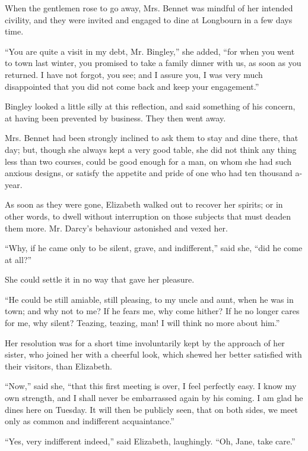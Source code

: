 When the gentlemen rose to go away, Mrs. Bennet was
mindful of her intended civility, and they were invited
and engaged to dine at Longbourn in a few days time.

“You are quite a visit in my debt, Mr. Bingley,” she
added, “for when you went to town last winter, you
promised to take a family dinner with us, as soon as you
returned. I have not forgot, you see; and I assure you,
I was very much disappointed that you did not come back
and keep your engagement.”

Bingley looked a little silly at this reflection, and said
something of his concern, at having been prevented by
business. They then went away.

Mrs. Bennet had been strongly inclined to ask them to
stay and dine there, that day; but, though she always
kept a very good table, she did not think any thing less
than two courses, could be good enough for a man, on
whom she had such anxious designs, or satisfy the appetite
and pride of one who had ten thousand a-year.


As soon as they were gone, Elizabeth walked out to
recover her spirits; or in other words, to dwell without
interruption on those subjects that must deaden them
more. Mr. Darcy’s behaviour astonished and vexed her.

“Why, if he came only to be silent, grave, and indifferent,”
said she, “did he come at all?”

She could settle it in no way that gave her pleasure.

“He could be still amiable, still pleasing, to my uncle
and aunt, when he was in town; and why not to me?
If he fears me, why come hither? If he no longer cares
for me, why silent? Teazing, teazing, man! I will think
no more about him.”

Her resolution was for a short time involuntarily kept
by the approach of her sister, who joined her with a cheerful
look, which shewed her better satisfied with their
visitors, than Elizabeth.

“Now,” said she, “that this first meeting is over, I feel
perfectly easy. I know my own strength, and I shall never
be embarrassed again by his coming. I am glad he dines
here on Tuesday. It will then be publicly seen, that on
both sides, we meet only as common and indifferent
acquaintance.”

“Yes, very indifferent indeed,” said Elizabeth, laughingly.
“Oh, Jane, take care.”

